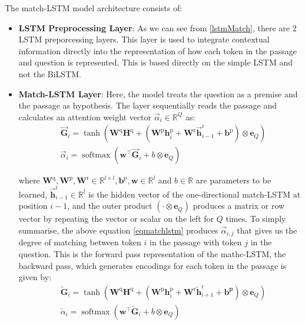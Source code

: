 \documentclass[a4paper,12pt]{report}
\begin{document}
             The match-LSTM model architecture consists of:
             \begin{itemize}
             	\item \textbf{LSTM Preprocessing Layer}: As we can see from \ref{lstmMatch}, there are 2 LSTM preporcessing layers. This layer is used to integrate contextual information directly into the representation of how each token in the passage and question is represented. This is based directly on the simple LSTM \citep{lstmoriginal} and not the BiLSTM.
             	\item \textbf{Match-LSTM Layer}: Here, the model treats the question as a premise and the passage as hypothesis. The layer sequentially reads the passage and calculates an attention weight vector $ \vec{\alpha}_{i} \in \mathbb{R}^{Q}$ as:
             	\begin{equation}\label{eqmatchlstm}
             		\begin{aligned}
             			&\overrightarrow{\mathbf{G}}_{i}=\tanh \left(\mathbf{W}^{\mathrm{q}} \mathbf{H}^{\mathrm{q}}+\left(\mathbf{W}^{\mathrm{p}} \mathbf{h}_{i}^{\mathrm{p}}+\mathbf{W}^{\mathrm{r}} \overrightarrow{\mathbf{h}}_{i-1}^{\mathrm{r}}+\mathbf{b}^{\mathrm{p}}\right) \otimes \mathbf{e}_{Q}\right) \\
             			&\vec{\alpha}_{i}=\operatorname{softmax}\left(\mathbf{w}^{\top} \overrightarrow{\mathbf{G}}_{i}+b \otimes \mathbf{e}_{Q}\right)
             		\end{aligned}
             	\end{equation}
             
			where $\mathbf{W}^{\mathrm{q}}, \mathbf{W}^{\mathrm{p}}, \mathbf{W}^{\mathrm{r}} \in \mathbb{R}^{l \times l}, \mathbf{b}^{\mathrm{p}}, \mathbf{w} \in \mathbb{R}^{l}$ and $b \in \mathbb{R}$ are parameters to be learned, $\overrightarrow{\mathbf{h}}_{i-1}^{\mathrm{r}} \in \mathbb{R}^{l}$ is the hidden vector of the one-directional match-LSTM at position $i-1$, and the outer product $\left(\cdot \otimes \mathbf{e}_{Q}\right)$ produces a matrix or row vector by repeating the vector or scalar on the left for $Q$ times. 
			To simply summarise, the above equation \ref{eqmatchlstm} produces  $ \vec{\alpha}_{i,j} $ that gives us the degree of matching between token $ i $ in the passage with token $ j $ in the question. This is the forward pass representation of the mathc-LSTM, the backward pass, which generates encodings for each token in the passage is given by: 
			\begin{equation}\label{eqmatchlstmreverse}
				\begin{aligned}
					&\overleftarrow{\mathbf{G}}_{i}=\tanh \left(\mathbf{W}^{\mathrm{q}} \mathbf{H}^{\mathrm{q}}+\left(\mathbf{W}^{\mathrm{p}} \mathbf{h}_{i}^{\mathrm{p}}+\mathbf{W}^{\mathrm{r}} \overleftarrow{\mathbf{h}}_{i+1}^{\mathrm{r}}+\mathbf{b}^{\mathbf{p}}\right) \otimes \mathbf{e}_{Q}\right) \\
					&\overleftarrow{\alpha}_{i}=\operatorname{softmax}\left(\mathbf{w}^{\top} \overleftarrow{\mathbf{G}}_{i}+b \otimes \mathbf{e}_{Q}\right)
				\end{aligned}
			\end{equation}
		

\end{itemize}
\end{document}
